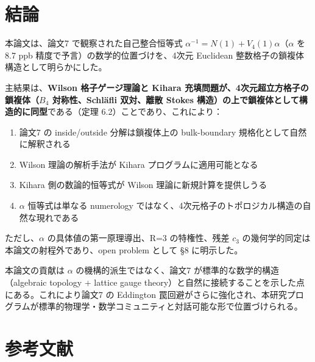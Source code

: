 \documentclass[a4paper,11pt]{ltjsarticle}
\begin{document}
\section{結論}

本論文は、論文7 で観察された自己整合恒等式 $\alpha^{-1} = N(1) + V_4(1)\alpha$（$\alpha$ を 8.7 ppb 精度で予言）の数学的位置づけを、4次元 Euclidean 整数格子の鎖複体構造として明らかにした。

主結果は、\textbf{Wilson 格子ゲージ理論と Kihara 充填問題が、4次元超立方格子の鎖複体（$B_4$ 対称性、Schläfli 双対、離散 Stokes 構造）の上で鎖複体として構造的に同型}である（定理 6.2）ことであり、これにより：

\begin{enumerate}
\item 論文7 の inside/outside 分解は鎖複体上の bulk-boundary 規格化として自然に解釈される
\item Wilson 理論の解析手法が Kihara プログラムに適用可能となる
\item Kihara 側の数論的恒等式が Wilson 理論に新規計算を提供しうる
\item $\alpha$ 恒等式は単なる numerology ではなく、4次元格子のトポロジカル構造の自然な現れである
\end{enumerate}

ただし、$\alpha$ の具体値の第一原理導出、R=3 の特権性、残差 $c_3$ の幾何学的同定は本論文の射程外であり、open problem として §8 に明示した。

本論文の貢献は $\alpha$ の機構的派生ではなく、論文7 が標準的な数学的構造（algebraic topology + lattice gauge theory）と自然に接続することを示した点にある。これにより論文7 の Eddington 罠回避がさらに強化され、本研究プログラムが標準的物理学・数学コミュニティと対話可能な形で位置づけられる。

\section*{参考文献}
\end{document}

